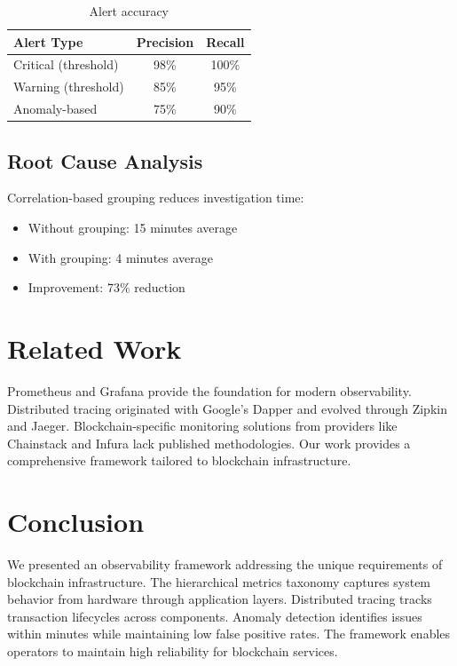 \documentclass[11pt,a4paper]{article}
\begin{document}
\begin{table}[h]
\centering
\begin{tabular}{lcc}
\hline
\textbf{Alert Type} & \textbf{Precision} & \textbf{Recall} \\
\hline
Critical (threshold) & 98\% & 100\% \\
Warning (threshold) & 85\% & 95\% \\
Anomaly-based & 75\% & 90\% \\
\hline
\end{tabular}
\caption{Alert accuracy}
\end{table}

\subsection{Root Cause Analysis}

Correlation-based grouping reduces investigation time:

\begin{itemize}
    \item Without grouping: 15 minutes average
    \item With grouping: 4 minutes average
    \item Improvement: 73\% reduction
\end{itemize}

\section{Related Work}

Prometheus and Grafana provide the foundation for modern observability. Distributed tracing originated with Google's Dapper and evolved through Zipkin and Jaeger. Blockchain-specific monitoring solutions from providers like Chainstack and Infura lack published methodologies. Our work provides a comprehensive framework tailored to blockchain infrastructure.

\section{Conclusion}

We presented an observability framework addressing the unique requirements of blockchain infrastructure. The hierarchical metrics taxonomy captures system behavior from hardware through application layers. Distributed tracing tracks transaction lifecycles across components. Anomaly detection identifies issues within minutes while maintaining low false positive rates. The framework enables operators to maintain high reliability for blockchain services.
\end{document}
